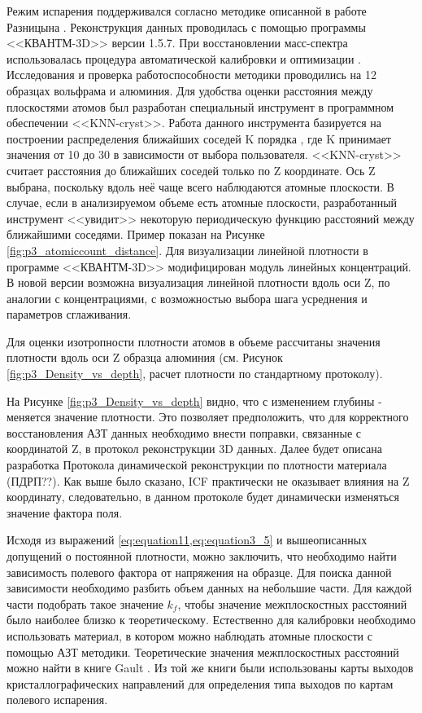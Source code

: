 Режим испарения поддерживался согласно методике описанной в работе Разницына \cite{scbibOptParamsYAFI}. Реконструкция данных проводилась с помощью программы <<КВАНТМ-3D>> версии 1.5.7. При восстановлении масс-спектра использовалась процедура автоматической калибровки и оптимизации \cite{Shutov19}. Исследования и проверка работоспособности методики проводились на 12 образцах вольфрама и алюминия. Для удобства оценки расстояния между плоскостями атомов был разработан специальный инструмент в программном обеспечении <<KNN-cryst>>. Работа данного инструмента базируется на построении распределения ближайших соседей K порядка \cite{GaultBOOK}, где K принимает значения от 10 до 30 в зависимости от выбора пользователя. <<KNN-cryst>> считает расстояния до ближайших соседей только по Z координате. Ось Z выбрана, поскольку вдоль неё чаще всего наблюдаются атомные плоскости. В случае, если в анализируемом объеме есть атомные плоскости, разработанный инструмент <<увидит>> некоторую периодическую функцию расстояний между ближайшими соседями. Пример показан на Рисунке \cref{fig:p3_atomiccount_distance}. Для визуализации линейной плотности в программе <<КВАНТМ-3D>> модифицирован модуль линейных концентраций. В новой версии возможна визуализация линейной плотности вдоль оси Z, по аналогии с концентрациями, с возможностью выбора шага усреднения и параметров сглаживания.

Для оценки изотропности плотности атомов в объеме рассчитаны значения плотности вдоль оси Z образца алюминия (см. Рисунок \cref{fig:p3_Density_vs_depth}, расчет плотности по стандартному протоколу). 

На Рисунке \cref{fig:p3_Density_vs_depth} видно, что с изменением глубины - меняется значение плотности. Это позволяет предположить, что для корректного восстановления АЗТ данных необходимо внести поправки, связанные с координатой Z, в протокол реконструкции 3D данных. Далее будет описана разработка Протокола динамической реконструкции по плотности материала (ПДРП??). Как выше было сказано, ICF практически не оказывает влияния на Z координату, следовательно, в данном протоколе будет динамически изменяться значение фактора поля.

Исходя из выражений \cref{eq:equation11,eq:equation3_5} и вышеописанных допущений о постоянной плотности, можно заключить, что необходимо найти зависимость полевого фактора от напряжения на образце. Для поиска данной зависимости необходимо разбить объем данных на небольшие части. Для каждой части подобрать такое значение $k_f$, чтобы значение межплоскостных расстояний было наиболее близко к теоретическому. Естественно для калибровки необходимо использовать материал, в котором можно наблюдать атомные плоскости с помощью АЗТ методики. Теоретические значения межплоскостных расстояний можно найти в книге Gault \cite{GaultBOOK}. Из той же книги были использованы карты выходов кристаллографических направлений для определения типа выходов по картам полевого испарения.

